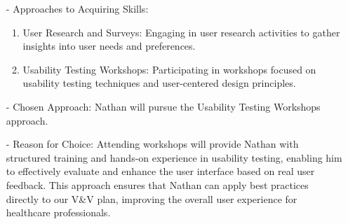 \documentclass[12pt, titlepage]{article}
\begin{document}
\begin{enumerate}
\begin{itemize}
      \item[-] Approaches to Acquiring Skills:
      \begin{enumerate}
          \item User Research and Surveys: Engaging in user research activities to gather insights into user needs and preferences.
          \item Usability Testing Workshops: Participating in workshops focused on usability testing techniques and user-centered design principles.
      \end{enumerate}
      
      \item[-] Chosen Approach: Nathan will pursue the Usability Testing Workshops approach.
      
      \item[-] Reason for Choice: Attending workshops will provide Nathan with structured training and hands-on experience in usability testing, enabling him to effectively evaluate and enhance the user interface based on real user feedback. This approach ensures that Nathan can apply best practices directly to our V\&V plan, improving the overall user experience for healthcare professionals.
  \end{itemize}

\end{enumerate}
\end{document}
